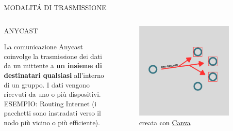\documentclass[aspectratio=1610,handout]{beamer}
\begin{document}
\begin{frame}{MODALIT\'A DI TRASMISSIONE}
    \begin{columns}
        \begin{alertblock}{ANYCAST}
            \begin{minipage}{0.96\linewidth}
                \justifying
                La comunicazione Anycast coinvolge la trasmissione dei dati da un mittente a \textbf{un 
                insieme di destinatari qualsiasi} all'interno di un gruppo. I dati vengono ricevuti da uno o più dispositivi.\\
                ESEMPIO: Routing Internet (i pacchetti sono instradati verso il nodo più vicino o più efficiente).                
            \end{minipage}
        \end{alertblock}
           \begin{figure}
               \includegraphics[width=\linewidth]{img/anycast.png}
               \caption{{creata con \href{https://www.canva.com}{Canva}}}
           \end{figure}
    \end{columns}
\end{frame}
\end{document}
